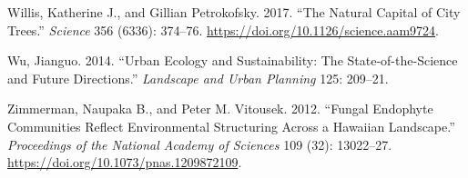 \documentclass[fleqn,10pt,lineno]{wlpeerj} %
\newlength{\cslhangindent}
\newenvironment{CSLReferences}[2] %
 {%
  \setlength{\parindent}{0pt}
  \ifodd #1 \everypar{\setlength{\hangindent}{\cslhangindent}}\ignorespaces\fi
  \ifnum #2 > 0
  \setlength{\parskip}{#2\baselineskip}
  \fi
 }%
 {}
\begin{document}
\begin{CSLReferences}{1}{0}
\leavevmode{}%
Willis, Katherine J., and Gillian Petrokofsky. 2017. {``The Natural
Capital of City Trees.''} \emph{Science} 356 (6336): 374--76.
\url{https://doi.org/10.1126/science.aam9724}.

\leavevmode{}%
Wu, Jianguo. 2014. {``Urban Ecology and Sustainability: The
State-of-the-Science and Future Directions.''} \emph{Landscape and Urban
Planning} 125: 209--21.

\leavevmode{}%
Zimmerman, Naupaka B., and Peter M. Vitousek. 2012. {``Fungal Endophyte
Communities Reflect Environmental Structuring Across a Hawaiian
Landscape.''} \emph{Proceedings of the National Academy of Sciences} 109
(32): 13022--27. \url{https://doi.org/10.1073/pnas.1209872109}.

\end{CSLReferences}
\end{document}
